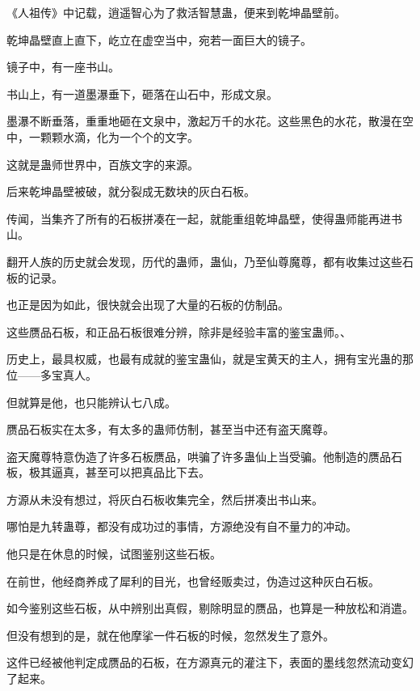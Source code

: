 \begin{this_body}
《人祖传》中记载，逍遥智心为了救活智慧蛊，便来到乾坤晶壁前。

乾坤晶壁直上直下，屹立在虚空当中，宛若一面巨大的镜子。

镜子中，有一座书山。

书山上，有一道墨瀑垂下，砸落在山石中，形成文泉。

墨瀑不断垂落，重重地砸在文泉中，激起万千的水花。这些黑色的水花，散漫在空中，一颗颗水滴，化为一个个的文字。

这就是蛊师世界中，百族文字的来源。

后来乾坤晶壁被破，就分裂成无数块的灰白石板。

传闻，当集齐了所有的石板拼凑在一起，就能重组乾坤晶壁，使得蛊师能再进书山。

翻开人族的历史就会发现，历代的蛊师，蛊仙，乃至仙尊魔尊，都有收集过这些石板的记录。

也正是因为如此，很快就会出现了大量的石板的仿制品。

这些赝品石板，和正品石板很难分辨，除非是经验丰富的鉴宝蛊师。、

历史上，最具权威，也最有成就的鉴宝蛊仙，就是宝黄天的主人，拥有宝光蛊的那位——多宝真人。

但就算是他，也只能辨认七八成。

赝品石板实在太多，有太多的蛊师仿制，甚至当中还有盗天魔尊。

盗天魔尊特意伪造了许多石板赝品，哄骗了许多蛊仙上当受骗。他制造的赝品石板，极其逼真，甚至可以把真品比下去。

方源从未没有想过，将灰白石板收集完全，然后拼凑出书山来。

哪怕是九转蛊尊，都没有成功过的事情，方源绝没有自不量力的冲动。

他只是在休息的时候，试图鉴别这些石板。

在前世，他经商养成了犀利的目光，也曾经贩卖过，伪造过这种灰白石板。

如今鉴别这些石板，从中辨别出真假，剔除明显的赝品，也算是一种放松和消遣。

但没有想到的是，就在他摩挲一件石板的时候，忽然发生了意外。

这件已经被他判定成赝品的石板，在方源真元的灌注下，表面的墨线忽然流动变幻了起来。

\end{this_body}

